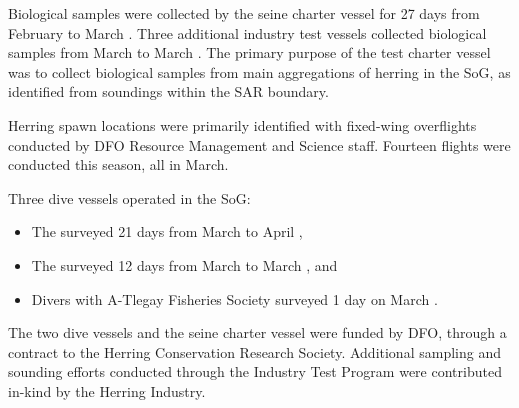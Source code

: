 Biological samples were collected by the seine charter vessel
 for 27 days from February  to March .
Three additional industry test vessels collected biological samples
from March  to March .
The primary purpose of the test charter vessel was to
collect biological samples from main aggregations of herring in the SoG,
as identified from soundings within the SAR boundary.

Herring spawn locations were primarily identified with
fixed-wing overflights conducted by DFO Resource Management and Science staff.
Fourteen flights were conducted this season, all in March.

Three dive vessels operated in the SoG:

\begin{itemize}

\item The  surveyed 21 days from March  to April ,

\item The  surveyed 12 days from March  to March , and

\item Divers with A-Tlegay Fisheries Society surveyed 1 day on March .

\end{itemize}

The two dive vessels and the seine charter vessel 
were funded by DFO,
through a contract to the Herring Conservation Research Society.
Additional sampling and sounding efforts conducted through the
Industry Test Program were contributed in-kind by the Herring Industry.
